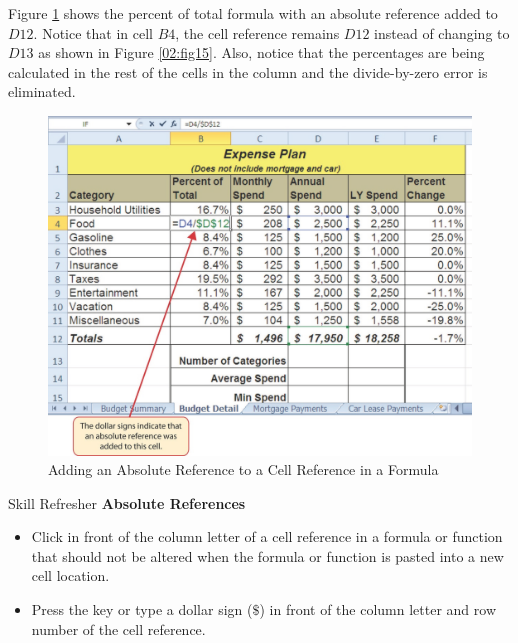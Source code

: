 Figure \ref{02:fig16} shows the percent of total formula with an absolute reference added to $ D12 $. Notice that in cell $ B4 $, the cell reference remains $ D12 $ instead of changing to $ D13 $ as shown in Figure \ref{02:fig15}. Also, notice that the percentages are being calculated in the rest of the cells in the column and the divide-by-zero error is eliminated.

\begin{figure}[H]
	\centering
	\includegraphics[width=\maxwidth{.95\linewidth}]{gfx/ch02_fig16}
	\caption{Adding an Absolute Reference to a Cell Reference in a Formula}
	\label{02:fig16}
\end{figure}

\begin{center}
	\begin{sklbox}{Skill Refresher}
		\textbf{Absolute References}
		\\
		\begin{itemize}
			\setlength{\itemsep}{0pt}
			\setlength{\parskip}{0pt}
			\setlength{\parsep}{0pt}
			
			\item Click in front of the column letter of a cell reference in a formula or function that should not be altered when the formula or function is pasted into a new cell location.
			\item Press the  key or type a dollar sign ($ \$ $) in front of the column letter and row number of the cell reference.

		\end{itemize}
	\end{sklbox}
\end{center}

